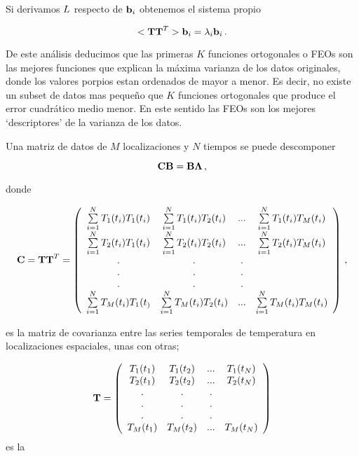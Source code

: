 \documentclass[
]{agujournal2019}
\begin{document}
Si derivamos \({\textbf \cal L}\) respecto de \({\textbf b}_i\)
obtenemos el sistema propio

\[<{\textbf T}{\textbf T}^T>{\textbf b}_i=\lambda_i{\textbf b}_i\,.\]

De este análisis deducimos que las primeras \(K\) funciones ortogonales
o FEOs son las mejores funciones que explican la máxima varianza de los
datos originales, donde los valores porpios estan ordenados de mayor a
menor. Es decir, no existe un subset de datos mas pequeño que \(K\)
funciones ortogonales que produce el error cuadrático medio menor. En
este sentido las FEOs son los mejores `descriptores' de la varianza de
los datos.

Una matriz de datos de \(M\) localizaciones y \(N\) tiempos se puede
descomponer

\[\bf {C} \bf {B}=\bf {B} {\Lambda}\,,\]

donde

\[{\textbf C}={\textbf T}{\textbf T}^T=\left(\begin{array}{cccc}
   \sum\limits_{i=1}^N{T_{1}(t_i)T_{1}(t_i)} & \sum\limits_{i=1}^N{T_{1}(t_i)T_{2}(t_i)} & ... & \sum\limits_{i=1}^N{T_{1}(t_i)T_{M}(t_i)}\\
   \sum\limits_{i=1}^N{T_{2}(t_i)T_{1}(t_i)} & \sum\limits_{i=1}^N{T_{2}(t_i)T_{2}(t_i)} & ... & \sum\limits_{i=1}^N{T_{2}(t_i)T_{M}(t_i)}\\
                . & . & . \\
        . & . & . \\
        . & . & . \\
   \sum\limits_{i=1}^N{T_{M}(t_i)T_{1}(t_)} & \sum\limits_{i=1}^N{T_{M}(t_i)T_{2}(t_i)} & ... & \sum\limits_{i=1}^N{T_{M}(t_i)T_{M}(t_i)}\\
        \end{array}\right)\,,\]

es la matriz de covarianza entre las series temporales de temperatura en
localizaciones espaciales, unas con otras;

\[{\textbf T}=\left(\begin{array}{cccc}
   T_{1}(t_1) & T_{1}(t_2) & ... & T_{1}(t_N)\\
   T_{2}(t_1) & T_{2}(t_2) & ... & T_{2}(t_N)\\
                . & . & . \\
        . & . & . \\
        . & . & . \\
   T_{M}(t_1) & T_{M}(t_2) & ... & T_{M}(t_N)\\
        \end{array}\right)\] es la
\end{document}
